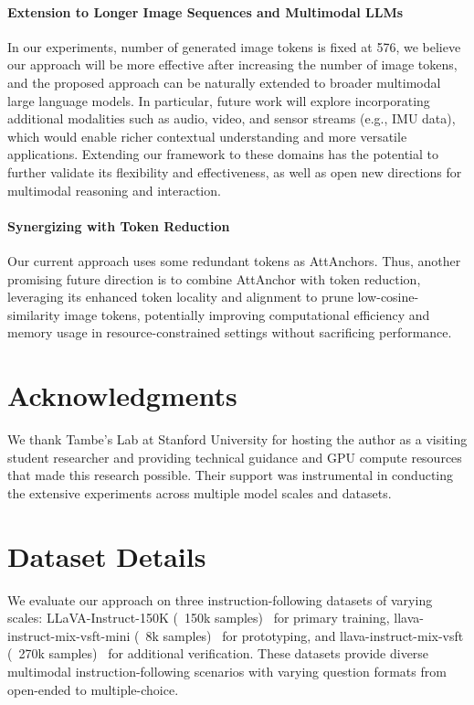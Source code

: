 \documentclass[11pt]{article}
\begin{document}
\paragraph{Extension to Longer Image Sequences and Multimodal LLMs} 
In our experiments, number of generated image tokens is fixed at 576, we believe our approach will be more effective after increasing the number of image tokens, and the proposed approach can be naturally extended to broader multimodal large language models. In particular, future work will explore incorporating additional modalities such as audio, video, and sensor streams (e.g., IMU data), which would enable richer contextual understanding and more versatile applications. Extending our framework to these domains has the potential to further validate its flexibility and effectiveness, as well as open new directions for multimodal reasoning and interaction.

\paragraph{Synergizing with Token Reduction} Our current approach uses some redundant tokens as AttAnchors. Thus, another promising future direction is to combine AttAnchor  with token reduction, leveraging its enhanced token locality and alignment to prune low-cosine-similarity image tokens, potentially improving computational efficiency and memory usage in resource-constrained settings without sacrificing performance.




\section{Acknowledgments}

We thank Tambe's Lab at Stanford University for hosting the author as a visiting student researcher and providing technical guidance and GPU compute resources that made this research possible. Their support was instrumental in conducting the extensive experiments across multiple model scales and datasets.





\appendix
\section{Dataset Details}
\label{app:datasets}


We evaluate our approach on three instruction-following datasets of varying scales: LLaVA-Instruct-150K (~150k samples)~\citep{liu2023llava} for primary training, llava-instruct-mix-vsft-mini (~8k samples)~\citep{unsloth_llava_instruct_mix_vsft_mini} for prototyping, and llava-instruct-mix-vsft (~270k samples)~\citep{huggingfaceh4_llava_instruct_mix_vsft} for additional verification. These datasets provide diverse multimodal instruction-following scenarios with varying question formats from open-ended to multiple-choice. 
\end{document}
